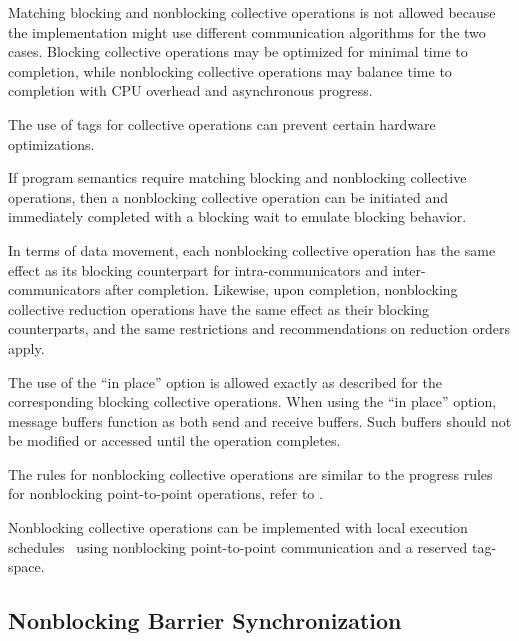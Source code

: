 \begin{rationale}
Matching blocking and nonblocking collective operations is not allowed
because the implementation might use different communication algorithms
for the two cases. Blocking collective operations may be optimized
for minimal time to completion, while nonblocking collective operations
may balance time to completion with CPU overhead and asynchronous
progress.

The use of tags for collective operations can prevent certain hardware
optimizations.
\end{rationale}

\begin{users}
If program semantics require matching blocking and nonblocking
collective operations, then a nonblocking collective operation can be
initiated and immediately completed with a blocking wait to emulate
blocking behavior.
\end{users}

In terms of data movement, each nonblocking collective operation has
the same effect as its blocking counterpart for intra-communicators and
inter-communicators after completion. Likewise, upon completion,
nonblocking collective reduction operations have the same effect as
their blocking counterparts, and the same restrictions and
recommendations on reduction orders apply.

The use of the ``in place'' option is allowed exactly as described for
the corresponding blocking collective operations.  When using the ``in
place'' option, message buffers function as both send and receive
buffers. Such buffers should not be modified or accessed until the
operation completes.

The 
rules for nonblocking collective operations are similar to
the progress rules for nonblocking point-to-point operations, refer to
 .

\begin{implementors}
Nonblocking collective operations can be implemented with local
execution schedules~\cite{hoefler-sc07} using nonblocking point-to-point
communication and a reserved tag-space.
\end{implementors}


\subsection{Nonblocking Barrier Synchronization}
\label{sec:nbcoll-ibarrier}

